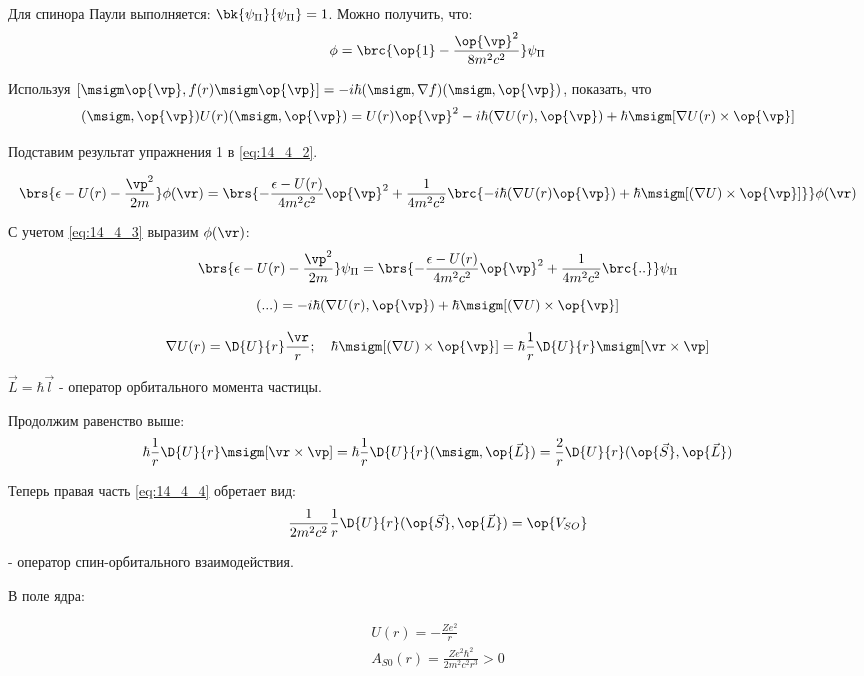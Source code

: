 Для спинора Паули выполняется: $\bk{\psi_\Pi}{\psi_\Pi} = 1$. Можно получить, что:
\begin{equation}
\label{eq:14_4_3}
\phi = \brc{\op{1} - \frac{\op{\vp}^2}{8m^2c^2}} \psi_\Pi
\end{equation}

\begin{excr}
Используя $[\msigm \op{\vp}, f(r) \msigm \op{\vp}] = -i\hbar (\msigm, \nabla f)(\msigm, \op{\vp})$, показать, что
$$
(\msigm, \op{\vp}) U(r) (\msigm, \op{\vp}) = U(r) \op{\vp}^2 - i \hbar (\nabla U(r), \op{\vp}) + \hbar \msigm [\nabla U(r) \times \op{\vp}]
$$
\end{excr}

Подставим результат упражнения 1 в \eqref{eq:14_4_2}.

$$
\brs{\epsilon - U(r) - \frac{{\vp}^2}{2m}}\phi(\vr) = \brs{- \frac{\epsilon - U(r)}{4m^2c^2}\op{\vp}^2 + \frac{1}{4m^2 c^2} \brc{-i\hbar (\nabla U(r) \op{\vp}) + \hbar \msigm [(\nabla U) \times \op{\vp}]}} \phi(\vr)
$$

С учетом \eqref{eq:14_4_3} выразим $\phi(\vr)$:
$$
\brs{\epsilon - U(r) - \frac{{\vp}^2}{2m}}\psi_\Pi = \brs{- \frac{\epsilon - U(r)}{4m^2c^2}\op{\vp}^2 + \frac{1}{4m^2 c^2} \brc{..}} \psi_\Pi
$$

\begin{equation}
\label{eq:14_4_4}
(...) = -i\hbar (\nabla U(r), \op{\vp}) + \hbar \msigm [(\nabla U) \times \op{\vp}]
\end{equation}

$$
\nabla U(r) = \D{U}{r} \frac{\vr}{r};~~~
\hbar \msigm [(\nabla U) \times \op{\vp}] = \hbar \frac{1}{r} \D{U}{r} \msigm [\vr \times \vp] 
$$

$\vec{L} = \hbar \vec{l}$ - оператор орбитального момента частицы.

Продолжим равенство выше:
$$
\hbar \frac{1}{r} \D{U}{r} \msigm [\vr \times \vp] = {\hbar} \frac{1}{r} \D{U}{r} (\msigm, \op{\vec{L}}) = \frac{2}{r} \D{U}{r} (\op{\vec{S}}, \op{\vec{L}})
$$

Теперь правая часть \eqref{eq:14_4_4} обретает вид: 
$$\frac{1}{2m^2c^2}\frac{1}{r} \D{U}{r} (\op{\vec{S}}, \op{\vec{L}}) = \op{V_{SO}}$$

- оператор спин-орбитального взаимодействия.

В поле ядра:

\begin{gather*}
U(r) = -\frac{Ze^2}{r} \\
\boxed{A_{S0} (r) = \frac{Ze^2 \hbar^2}{2m^2 c^2 r^3} > 0}
\end{gather*}

